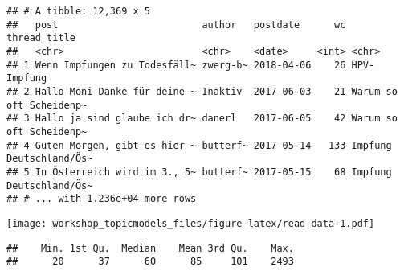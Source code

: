 \documentclass[
]{book}
\newenvironment{Shaded}{\begin{snugshade}}{\end{snugshade}}
\newcommand{\DataTypeTok}[1]{\textcolor[rgb]{0.13,0.29,0.53}{#1}}
\newcommand{\KeywordTok}[1]{\textcolor[rgb]{0.13,0.29,0.53}{\textbf{#1}}}
\newcommand{\NormalTok}[1]{#1}
\newcommand{\OperatorTok}[1]{\textcolor[rgb]{0.81,0.36,0.00}{\textbf{#1}}}
\newcommand{\StringTok}[1]{\textcolor[rgb]{0.31,0.60,0.02}{#1}}
\begin{document}
\begin{verbatim}
## # A tibble: 12,369 x 5
##   post                         author   postdate      wc thread_title           
##   <chr>                        <chr>    <date>     <int> <chr>                  
## 1 Wenn Impfungen zu Todesfäll~ zwerg-b~ 2018-04-06    26 HPV-Impfung            
## 2 Hallo Moni Danke für deine ~ Inaktiv  2017-06-03    21 Warum so oft Scheidenp~
## 3 Hallo ja sind glaube ich dr~ danerl   2017-06-05    42 Warum so oft Scheidenp~
## 4 Guten Morgen, gibt es hier ~ butterf~ 2017-05-14   133 Impfung Deutschland/Ös~
## 5 In Österreich wird im 3., 5~ butterf~ 2017-05-15    68 Impfung Deutschland/Ös~
## # ... with 1.236e+04 more rows
\end{verbatim}

\begin{Shaded}
\end{Shaded}

\texttt{[image: workshop\_topicmodels\_files/figure-latex/read-data-1.pdf]}

\begin{Shaded}
\end{Shaded}

\begin{verbatim}
##    Min. 1st Qu.  Median    Mean 3rd Qu.    Max. 
##      20      37      60      85     101    2493
\end{verbatim}
\end{document}
